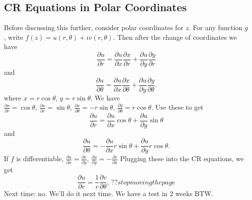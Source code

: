 \subsection{CR Equations in Polar Coordinates}
Before discussing this further, consider polar coordinates for $z$. For any function $g$, write $f(z)=u(r,\theta)+iv(r,\theta)$. Then after the change of coordinates we have \[
\frac{\partial u}{\partial r}=\frac{\partial u}{\partial x}\frac{\partial x}{\partial r}+\frac{\partial u}{\partial y}\frac{\partial y}{\partial r}
\] and \[
\frac{\partial u}{\partial \theta}=\frac{\partial u}{\partial x}\frac{\partial x}{\partial \theta}+\frac{\partial u}{\partial y}\frac{\partial y}{\partial \theta}.
\] where $x=r\cos\theta$, $y=r\sin \theta$. We have $\frac{\partial x}{\partial r}=\cos\theta,\, \frac{\partial x}{\partial r}=\sin \theta,\, \frac{\partial x}{\partial \theta}=-r\sin \theta,\, \frac{\partial y}{\partial \theta}=r\cos\theta$. Use these to get \[
\frac{\partial u}{\partial r}=\frac{\partial u}{\partial x}\cos\theta+\frac{\partial u}{\partial y}\sin\theta
\] and \[
\frac{\partial u}{\partial \theta}=-\frac{\partial u}{\partial x}r\sin\theta + \frac{\partial u}{\partial y}r\cos\theta.
\] If $f$ is differentiable, $\frac{\partial u}{\partial x}=\frac{\partial v}{\partial y}$, $\frac{\partial u}{\partial y}=-\frac{\partial v}{\partial x}$
Plugging these into the CR equations, we get \[
\frac{\partial u}{\partial r}=\frac{1}{r}\frac{\partial v}{\partial \theta},\, ?? stop moving the page
\] 
Next time: no. We'll do it next time. We have a test in 2 weeks BTW.
